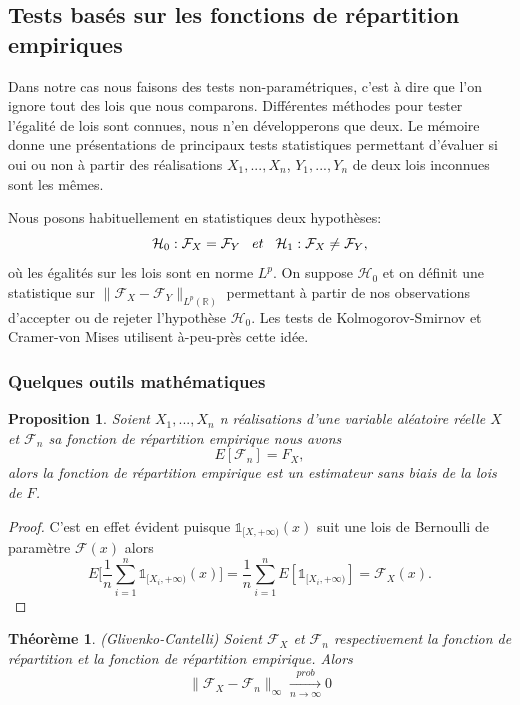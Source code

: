 \documentclass[a4paper,10pt]{article}
\newtheorem{theorem}{Théorème}[section]
\newtheorem{proposition}{Proposition}
\begin{document}
\subsection{Tests basés sur les fonctions de répartition empiriques}
Dans notre cas nous faisons des tests non-paramétriques, c'est à dire que l'on ignore tout des lois que nous comparons.
Différentes méthodes pour tester l'égalité de lois sont connues, nous n'en développerons que deux. Le mémoire \cite{ethier2011propos} donne une présentations de principaux tests statistiques permettant d'évaluer si oui ou non à partir des réalisations $X_1,...,X_n$, $Y_1,...,Y_n$ de deux lois inconnues sont les mêmes. 

Nous posons habituellement en statistiques deux hypothèses:
\[ \mathcal{H}_0: \mathcal{F}_{X} = \mathcal{F}_{Y} \hspace{3mm} et \hspace{3mm} \mathcal{H}_1: \mathcal{F}_{X} \neq \mathcal{F}_{Y},\]
où les égalités sur les lois sont en norme $L^p$. On suppose $\mathcal{H}_0$ et on définit une statistique sur $\|\mathcal{F}_{X}-\mathcal{F}_{Y}\|_{L^p(\mathbb{R})}$ permettant à partir de nos observations d'accepter ou de rejeter l'hypothèse $\mathcal{H}_0$.
Les tests de Kolmogorov-Smirnov et Cramer-von Mises utilisent à-peu-près cette idée. 

\subsubsection{Quelques outils mathématiques}

\begin{proposition}
	\label{mean-rep-emp}
	Soient $X_1,...,X_n$ n réalisations d'une variable aléatoire réelle $X$ et $\mathcal{F}_{n}$ sa fonction de répartition empirique nous avons
	\[E[\mathcal{F}_n]=F_{X},\]
	alors la fonction de répartition empirique est un estimateur sans biais de la lois de $F$. 
\end{proposition}

\begin{proof}
	C'est en effet évident puisque $\mathds{1}_{[X, +\infty )}(x)$ suit une lois de Bernoulli de paramètre $\mathcal{F}(x)$ alors 
	\[E\Big[\frac{1}{n}\sum_{i=1}^{n}\mathds{1}_{[X_i, +\infty )}(x)\Big]= \frac{1}{n}\sum_{i=1}^{n}E[\mathds{1}_{[X_i, +\infty )}]=\mathcal{F}_{X}(x).\]
\end{proof}


\begin{theorem}(Glivenko-Cantelli)
	\label{th-glivenko}
Soient $\mathcal{F}_{X}$ et $\mathcal{F}_{n}$ respectivement la fonction de répartition et la fonction de répartition empirique. Alors 
\begin{equation}
	\|\mathcal{F}_{X}-\mathcal{F}_{n}\|_{\infty} \xrightarrow[n\to \infty]{prob} 0 
\end{equation}
\end{theorem}
\end{document}
